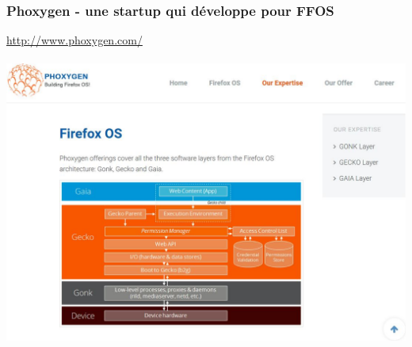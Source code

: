 \documentclass{beamer}
\begin{document}
\begin{frame}
\frametitle{Phoxygen - une startup qui développe pour FFOS}
\begin{center}
\url{http://www.phoxygen.com/}
\\~\\
\includegraphics[scale=0.45]{./images/Phoxygen.jpg}
\end{center}
\end{frame}
\end{document}
